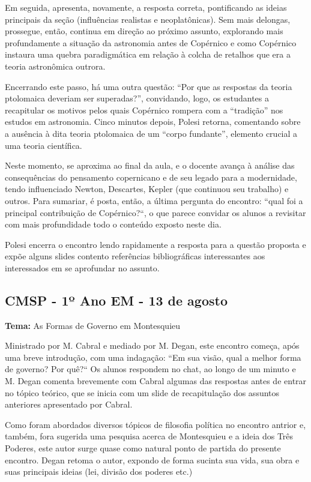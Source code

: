 \documentclass[12pt,a4paper]{article}
\begin{document}
	Em seguida, apresenta, novamente, a resposta correta, pontificando as 
	ideias principais da seção (influências realistas e neoplatônicas). 
	Sem mais delongas, prossegue, então, continua em direção ao próximo 
	assunto, explorando mais profundamente a situação da astronomia 
	antes de Copérnico e como Copérnico instaura uma quebra paradigmática 
	em relação à colcha de retalhos que era a teoria astronômica outrora. 

	Encerrando este passo, há uma outra questão: “Por que as respostas da 
	teoria ptolomaica deveriam ser superadas?”, convidando, logo, os 
	estudantes a recapitular os motivos pelos quais Copérnico rompera com 
	a “tradição” nos estudos em astronomia. Cinco minutos depois, Polesi 
	retorna, comentando sobre a ausência à dita teoria ptolomaica de um 
	“corpo fundante”, elemento crucial a uma teoria científica. 

	Neste momento, se aproxima ao final da aula, e o docente avança à 
	análise das consequências do pensamento copernicano e de seu legado 
	para a modernidade, tendo influenciado Newton, Descartes, Kepler 
	(que continuou seu trabalho) e outros. Para sumariar, é posta, então, 
	a última pergunta do encontro: “qual foi a principal contribuição de 
	Copérnico?“, o que parece convidar os alunos a revisitar com mais 
	profundidade todo o conteúdo exposto neste dia. 

	Polesi encerra o encontro lendo rapidamente a resposta para a questão 
	proposta e expõe alguns slides contento referências bibliográficas 
	interessantes aos interessados em se aprofundar no assunto. 

	\subsection{CMSP - 1º Ano EM - 13 de agosto}

	\textbf{Tema:} As Formas de Governo em Montesquieu

	Ministrado por M. Cabral e mediado por M. Degan, este encontro começa, 
	após uma breve introdução, com uma indagação: “Em sua visão, qual a 
	melhor forma de governo? Por quê?“ Os alunos respondem no chat, 
	ao longo de um minuto e M. Degan comenta brevemente com Cabral algumas 
	das respostas antes de entrar no tópico teórico, que se inicia com 
	um slide de recapitulação dos assuntos anteriores apresentado por 
	Cabral. 

	Como foram abordados diversos tópicos de filosofia política no 
	encontro antrior e, também, fora sugerida uma pesquisa acerca de 
	Montesquieu e a ideia dos Três Poderes, este autor surge quase 
	como natural ponto de partida do presente encontro. Degan retoma 
	o autor, expondo de forma sucinta sua vida, sua obra e suas 
	principais ideias (lei, divisão dos poderes etc.) 
\end{document}
